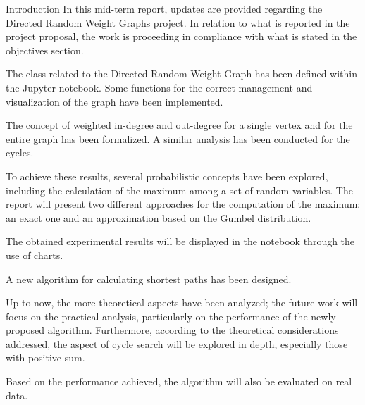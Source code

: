 \begin{projsection}{Introduction}
In this mid-term report, updates are provided regarding the Directed Random Weight Graphs project. In relation to what is reported in the project proposal, the work is proceeding in compliance with what is stated in the objectives section. 

The class related to the Directed Random Weight Graph has been defined within the Jupyter notebook. Some functions for the correct management and visualization of the graph have been implemented.

The concept of weighted in-degree and out-degree for a single vertex and for the entire graph has been formalized.
A similar analysis has been conducted for the cycles.

To achieve these results, several probabilistic concepts have been explored, including the calculation of the maximum among a set of random variables.
The report will present two different approaches for the computation of the maximum: an exact one and an approximation based on the Gumbel distribution.

The obtained experimental results will be displayed in the notebook through the use of charts. 

A new algorithm for calculating shortest paths has been designed.

Up to now, the more theoretical aspects have been analyzed; the future work will focus on the practical analysis, particularly on the performance of the newly proposed algorithm. Furthermore, according to the theoretical considerations addressed, the aspect of cycle search will be explored in depth, especially those with positive sum. 

Based on the performance achieved, the algorithm will also be evaluated on real data. 
\end{projsection}

